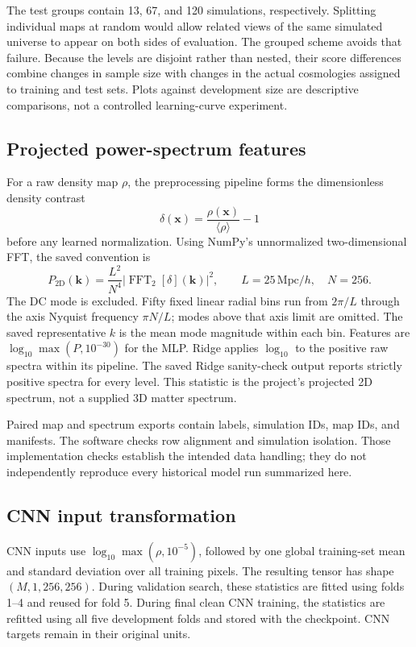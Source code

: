 \documentclass[11pt,a4paper]{article}
\begin{document}
The test groups contain 13, 67, and 120 simulations, respectively. Splitting individual maps at random would allow related views of the same simulated universe to appear on both sides of evaluation. The grouped scheme avoids that failure. Because the levels are disjoint rather than nested, their score differences combine changes in sample size with changes in the actual cosmologies assigned to training and test sets. Plots against development size are descriptive comparisons, not a controlled learning-curve experiment.

\subsection{Projected power-spectrum features}
For a raw density map $\rho$, the preprocessing pipeline forms the dimensionless density contrast
\begin{equation}
\delta(\mathbf{x})=\frac{\rho(\mathbf{x})}{\langle\rho\rangle}-1
\end{equation}
before any learned normalization. Using NumPy's unnormalized two-dimensional FFT, the saved convention is
\begin{equation}
P_{\mathrm{2D}}(\mathbf{k})=\frac{L^2}{N^4}\left|\operatorname{FFT}_2[\delta](\mathbf{k})\right|^2,
\qquad L=25\,\mathrm{Mpc}/h,\quad N=256.
\end{equation}
The DC mode is excluded. Fifty fixed linear radial bins run from $2\pi/L$ through the axis Nyquist frequency $\pi N/L$; modes above that axis limit are omitted. The saved representative $k$ is the mean mode magnitude within each bin. Features are $\log_{10}\max(P,10^{-30})$ for the MLP. Ridge applies $\log_{10}$ to the positive raw spectra within its pipeline. The saved Ridge sanity-check output reports strictly positive spectra for every level. This statistic is the project's projected 2D spectrum, not a supplied 3D matter spectrum.

Paired map and spectrum exports contain labels, simulation IDs, map IDs, and manifests. The software checks row alignment and simulation isolation. Those implementation checks establish the intended data handling; they do not independently reproduce every historical model run summarized here.

\subsection{CNN input transformation}
CNN inputs use $\log_{10}\max(\rho,10^{-5})$, followed by one global training-set mean and standard deviation over all training pixels. The resulting tensor has shape $(M,1,256,256)$. During validation search, these statistics are fitted using folds 1--4 and reused for fold 5. During final clean CNN training, the statistics are refitted using all five development folds and stored with the checkpoint. CNN targets remain in their original units.
\end{document}
